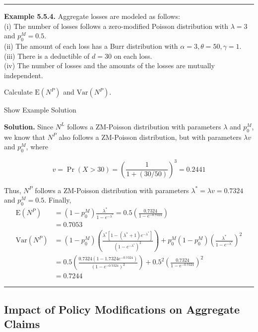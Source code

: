 \documentclass[]{book}
\theoremstyle{definition}
\theoremstyle{definition}
\theoremstyle{definition}
\theoremstyle{remark}
\begin{document}
\begin{center}\rule{0.5\linewidth}{\linethickness}\end{center}

\textbf{Example 5.5.4.} Aggregate losses are modeled as follows:\\
(i) The number of losses follows a zero-modified Poisson distribution
with \(\lambda=3\) and \(p_0^M = 0.5\).\\
(ii) The amount of each loss has a Burr distribution with
\(\alpha=3, \theta=50, \gamma=1\).\\
(iii) There is a deductible of \(d=30\) on each loss.\\
(iv) The number of losses and the amounts of the losses are mutually
independent.

Calculate \(\mathrm{E}(N^P)\) and \(\mathrm{Var}(N^P)\).

Show Example Solution

\hypertarget{toggleExampleAggLoss.5.4}{}
\textbf{Solution.} Since \(N^L\) follows a ZM-Poisson distribution with
parameters \(\lambda\) and \(p_0^M\), we know that \(N^P\) also follows
a ZM-Poisson distribution, but with parameters \(\lambda v\) and
\(p_0^M\), where

\[v = \Pr(X>30) = \left( \frac{1}{1+(30/50)} \right)^3 = 0.2441\]

Thus, \(N^P\) follows a ZM-Poisson distribution with parameters
\(\lambda^\ast = \lambda v= 0.7324\) and \(p_0^M = 0.5\). Finally,
\[\begin{aligned}
\mathrm{E} (N^P) &= (1-p_0^M) \frac{\lambda^\ast}{1-e^{-\lambda^\ast}} = 0.5 \left( \frac{0.7324}{1-e^{-0.7324}} \right) \\
&= 0.7053 \\
\mathrm{Var} (N^P) &= (1-p_0^M) \left( \frac{\lambda^\ast[1-(\lambda^\ast + 1) e^{-\lambda^\ast}]}{(1-e^{-\lambda^\ast})^2} \right) + p_0^M(1-p_0^M) \left(\frac{\lambda^\ast}{1-e^{-\lambda^\ast}} \right)^2 \\
&= 0.5 \left( \frac{0.7324(1-1.7324 e^{-0.7324})}{(1-e^{-0.7324})^2} \right) + 0.5^2 \left( \frac{0.7324}{1-e^{-0.7324}} \right)^2 \\
&= 0.7244
\end{aligned}\]

\begin{center}\rule{0.5\linewidth}{\linethickness}\end{center}

\subsection{Impact of Policy Modifications on Aggregate
Claims}\label{impact-of-policy-modifications-on-aggregate-claims}
\end{document}

